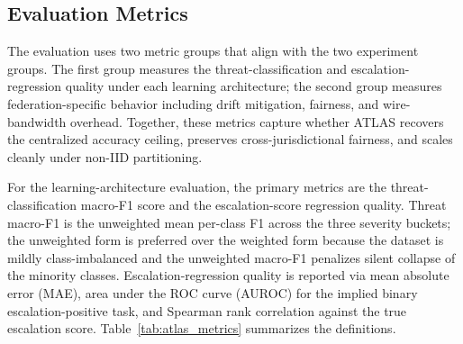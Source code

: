 \documentclass[conference]{IEEEtran}
\begin{document}
\subsection{Evaluation Metrics}

The evaluation uses two metric groups that align with the two experiment groups. The first group measures the threat-classification and escalation-regression quality under each learning architecture; the second group measures federation-specific behavior including drift mitigation, fairness, and wire-bandwidth overhead. Together, these metrics capture whether ATLAS recovers the centralized accuracy ceiling, preserves cross-jurisdictional fairness, and scales cleanly under non-IID partitioning.

For the learning-architecture evaluation, the primary metrics are the threat-classification macro-F1 score and the escalation-score regression quality. Threat macro-F1 is the unweighted mean per-class F1 across the three severity buckets; the unweighted form is preferred over the weighted form because the dataset is mildly class-imbalanced and the unweighted macro-F1 penalizes silent collapse of the minority classes. Escalation-regression quality is reported via mean absolute error (MAE), area under the ROC curve (AUROC) for the implied binary escalation-positive task, and Spearman rank correlation against the true escalation score. Table~\ref{tab:atlas_metrics} summarizes the definitions.
\end{document}
